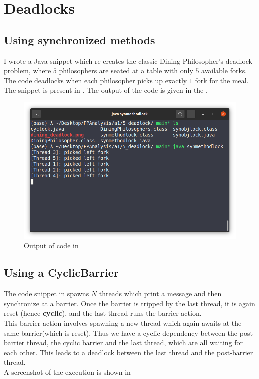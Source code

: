 \documentclass{article}
\begin{document}
  \section{Deadlocks}
    \subsection{Using synchronized methods}
      I wrote a Java snippet which re-creates the classic Dining Philosopher's deadlock problem, where $5$ philosophers are seated at a table with only $5$ available forks. The code deadlocks when each philosopher picks up exactly $1$ fork for the meal. The snippet is present in . The output of the code is given in the .

      

      \begin{figure}[ht]
        \centering
        \includegraphics[scale=0.5]{5_deadlock/synchronized_method_deadlock.png}
        \caption{Output of code in }
        \label{fig::51}
      \end{figure}

    \subsection{Using a CyclicBarrier}
      The code snippet in  spawns $N$ threads which print a message and then synchronize at a barrier. Once the barrier is tripped by the last thread, it is again reset (hence \textbf{cyclic}), and the last thread runs the barrier action.\\
      This barrier action involves spawning a new thread which again awaits at the same barrier(which is reset). Thus we have a cyclic dependency between the post-barrier thread, the cyclic barrier and the last thread, which are all waiting for each other. This leads to a deadlock between the last thread and the post-barrier thread.\\
      A screenshot of the execution is shown in 
      
\end{document}
